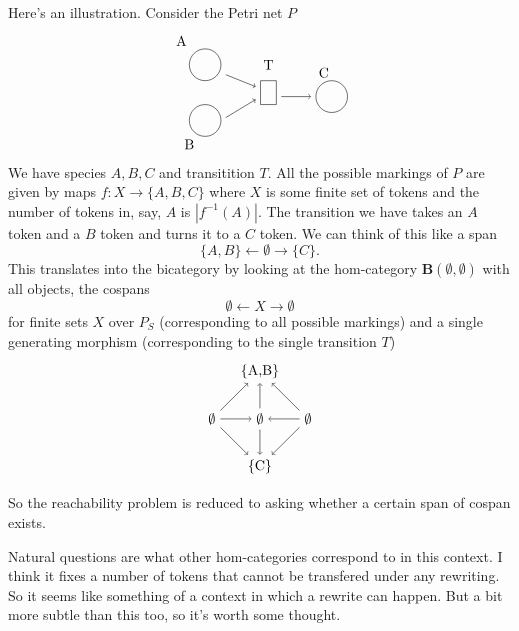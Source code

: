 \documentclass[11pt]{amsart}
\newcommand{\cat}[1]{\mathbf{#1}}
\newcommand{\from}{\colon}
\theoremstyle{remark}
\theoremstyle{definition}
\begin{document}
Here's an illustration.  
Consider the Petri net $P$
 \[
 \begin{tikzpicture}
 \draw  (-0.6,0.6) ellipse (0.4 and 0.4);
 \draw  (-0.6,-0.8) ellipse (0.4 and 0.4);
 \draw  (2.6,-0.2) ellipse (0.4 and 0.4);
 \draw  (0.8,0.2) rectangle (1.2,-0.4);
 \node (v1) at (-0.2,0.4) {};
 \node (v2) at (0.8,0) {};
 \node (v3) at (-0.2,-0.8) {};
 \node (v4) at (0.8,-0.2) {};
 \node (v5) at (1.2,-0.2) {};
 \node (v6) at (2.2,-0.2) {};
 \draw [->] (v1) edge (v2);
 \draw [->] (v3) edge (v4);
 \draw [->] (v5) edge (v6);
 \node at (-1.2,1.2) {A};
 \node at (-1,-1.4) {B};
 \node at (2.4,0.4) {C};
 \node at (1,0.6) {T};
 \end{tikzpicture}
 \]
We have species $A,B,C$ and 
transitition $T$. 
All the possible markings
of $P$ are given by maps
$f \from X \to \{A,B,C\}$ where 
$X$ is some finite set
of tokens and the number
of tokens in, say, $A$ is $ |f^{-1} (A)|$.
The transition we have takes
an $A$ token and a $B$ token 
and turns it to a $C$ token.  
We can think of this like a span
\[
	\{A,B\} \gets \emptyset \to \{C\}.
\]
This translates into the 
bicategory by looking at the 
hom-category
$ \cat{B} ( \emptyset , \emptyset ) $
with all objects, the cospans
\[
	\emptyset \gets X \to \emptyset
\]
for finite sets $X$ over $P_S$ 
(corresponding to all possible markings)
and a single generating morphism
(corresponding to the single 
transition $T$)
\[
\begin{tikzpicture}
\node (v1) at (-1,-2.2) {$\emptyset$};
\node (v2) at (0.2,-1) {\{A,B\}};
\node (v3) at (0.2,-2.2) {$\emptyset$};
\node (v4) at (0.2,-3.4) {\{C\}};
\node (v5) at (1.4,-2.2) {$\emptyset$};
\draw [->]  (v1) edge (v2);
\draw [->] (v1) edge (v3);
\draw [->] (v1) edge (v4);
\draw [->] (v5) edge (v2);
\draw [->] (v5) edge (v3);
\draw [->] (v5) edge (v4);
\draw [->] (v3) edge (v2);
\draw [->] (v3) edge (v4);
\end{tikzpicture}
\]

So the reachability problem
is reduced to asking whether
a certain span of cospan exists.

Natural questions are what other
hom-categories correspond to 
in this context. 
I think it fixes a number of tokens
that cannot be transfered
under any rewriting.  
So it seems like something
of a context in which
a rewrite can happen.  
But a bit more subtle
than this too, so 
it's worth some thought.










%
%
\end{document}
